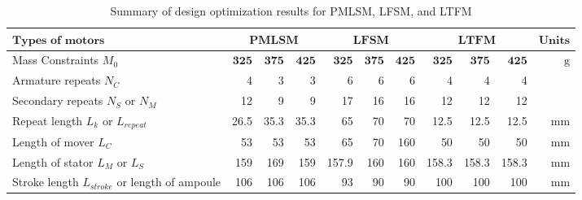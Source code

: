        \begin{landscape}
            \begin{table}[]
                \renewcommand{\arraystretch}{1.2}
                \caption{Summary of design optimization results for PMLSM, LFSM, and LTFM}
                \label{table:chap/rsm/overall optimization results}
                \begin{tabular}{l|rrr|rrr|rrr|r}
                \hline
                \multicolumn{1}{l|}{$\textbf{Types of motors}$}                         & \multicolumn{3}{c|}{$\textbf{PMLSM}$}            & \multicolumn{3}{c|}{$\textbf{LFSM}$}             & \multicolumn{3}{c|}{$\textbf{LTFM}$}             &  {$\textbf{Units}$}              \\ 
                \hline
                Mass Constraints $M_0$                                       & $\textbf{325}$ & $\textbf{375}$ & $\textbf{425}$ & $\textbf{325}$ & $\textbf{375}$ & $\textbf{425}$ & $\textbf{325}$ & $\textbf{375}$ & $\textbf{425}$ & $\mathrm{g}$   \\
                Armature repeats $N_C$                                       & 4              & 3              & 3              & 6              & 6              & 6              & 4              & 4              & 4              &                \\
                Secondary repeats $N_S$ or $N_M$                             & 12             & 9              & 9              & 17             & 16             & 16             & 12             & 12             & 12             &                \\
                Repeat length $L_k$ or $L_{repeat}$                          & 26.5           & 35.3           & 35.3           & 65             & 70             & 70             & 12.5           & 12.5           & 12.5           & \multicolumn{1}{r}{$\mathrm{mm}$} \\
                Length of mover $L_C$                                        & 53             & 53             & 53             & 65             & 70             & 160            & 50             & 50             & 50             & \multicolumn{1}{r}{$\mathrm{mm}$} \\
                Length of stator $L_M$ or $L_S$                              & 159            & 169            & 159            & 157.9          & 160            & 160            & 158.3          & 158.3          & 158.3          & \multicolumn{1}{r}{$\mathrm{mm}$} \\
                Stroke length $L_{stroke}$ or length of ampoule              & 106            & 106            & 106            & 93             & 90             & 90             & 100            & 100            & 100            & $\mathrm{mm}$  \\

\end{tabular}
\end{table}
\end{landscape}
